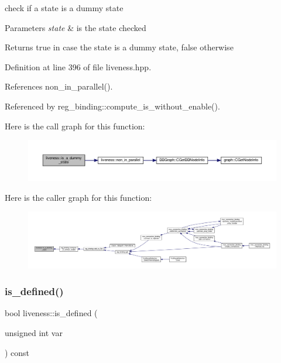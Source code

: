 check if a state is a dummy state 


\begin{DoxyParams}{Parameters}
{\em state} & is the state checked \\
\hline
\end{DoxyParams}
\begin{DoxyReturn}{Returns}
true in case the state is a dummy state, false otherwise 
\end{DoxyReturn}


Definition at line 396 of file liveness.\+hpp.



References non\+\_\+in\+\_\+parallel().



Referenced by reg\+\_\+binding\+::compute\+\_\+is\+\_\+without\+\_\+enable().

Here is the call graph for this function\+:
\nopagebreak
\begin{figure}[H]
\begin{center}
\leavevmode
\includegraphics[width=350pt]{d3/d1f/classliveness_a4445a17a1bd1fa7190ee4c5b318fb47f_cgraph}
\end{center}
\end{figure}
Here is the caller graph for this function\+:
\nopagebreak
\begin{figure}[H]
\begin{center}
\leavevmode
\includegraphics[width=350pt]{d3/d1f/classliveness_a4445a17a1bd1fa7190ee4c5b318fb47f_icgraph}
\end{center}
\end{figure}
\mbox{\label{classliveness_a184761795960c7d447a2a20799bbe020}} 
\subsubsection{\texorpdfstring{is\+\_\+defined()}{is\_defined()}}
{\footnotesize\ttfamily bool liveness\+::is\+\_\+defined (\begin{DoxyParamCaption}\item[{unsigned int}]{var }\end{DoxyParamCaption}) const}




